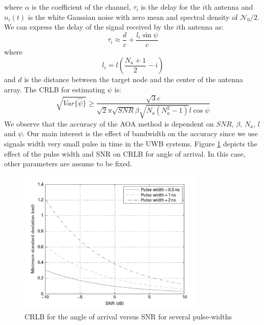 \documentclass[\main/thesis.tex]{subfiles}
\begin{document}
where $\alpha$ is the coefficient of the channel, $\tau_i$ is the delay for the $i$th antenna and $n_i(t)$ is the white Gaussian noise with zero mean and spectral density of $\mathcal{N}_0/2$. We can express the delay of the signal received by the $i$th antenna as:
\begin{equation}
    \tau_i \approx \frac{d}{c} + \frac{l_i \sin{\psi}}{c}
\end{equation}
where
\begin{equation}
    l_i = l \left( \frac{N_a+1}{2} - i \right)
\end{equation}
and $d$ is the distance between the target node and the center of the antenna array. The CRLB for estimating $\psi$ is:
\begin{equation}
    \sqrt{Var\{\hat{\psi}\}} \geq \frac{\sqrt{3}c}{\sqrt{2}\pi\sqrt{SNR}\beta\sqrt{N_a(N_a^2-1)}l\cos{\psi}}
\end{equation}
We observe that the accuracy of the AOA method is dependent on $SNR$, $\beta$, $N_a$, $l$ and $\psi$. Our main interest is the effect of bandwidth on the accuracy since we use signals width very small pulse in time in the UWB systems. Figure \ref{fig:aoa_crlb_ for_angle_of_arrival_versus_snr} depicts the effect of the pulse width and SNR on CRLB for angle of arrival. In this case, other parameters are assume to be fixed.

\begin{figure}[H]
    \centering
    \includegraphics[width=0.8\textwidth]{aoa_crlb_for_angle_of_arrival_versus_snr}
    \caption{CRLB for the angle of arrival versus SNR for several pulse-widths}
    \label{fig:aoa_crlb_ for_angle_of_arrival_versus_snr}
\end{figure}
\end{document}
